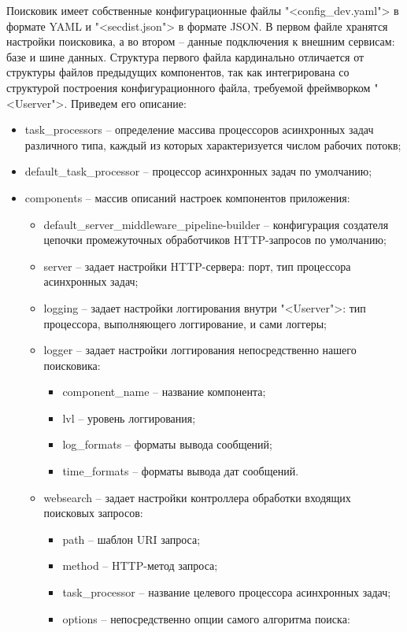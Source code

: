 Поисковик имеет собственные конфигурационные файлы "<config\_dev.yaml"> в формате YAML и "<secdist.json"> в формате JSON. В первом файле хранятся настройки поисковика, а во втором -- данные подключения к внешним сервисам: базе и шине данных. Структура первого файла кардинально отличается от структуры файлов предыдущих компонентов, так как интегрирована со структурой построения конфигурационного файла, требуемой фреймворком "<Userver">. Приведем его описание:
\begin{itemize}
\item task\_processors -- определение массива процессоров асинхронных задач различного типа, каждый из которых характеризуется числом рабочих потокв;
\item default\_task\_processor -- процессор асинхронных задач по умолчанию;
\item components -- массив описаний настроек компонентов приложения:
\begin{itemize}
\item default\_server\_middleware\_pipeline-builder -- конфигурация создателя цепочки промежуточных обработчиков HTTP-запросов по умолчанию;
\item server -- задает настройки HTTP-сервера: порт, тип процессора асинхронных задач;
\item logging -- задает настройки логгирования внутри "<Userver">: тип процессора, выполняющего логгирование, и сами логгеры;
\item logger -- задает настройки логгирования непосредственно нашего поисковика:
\begin{itemize}
\item component\_name -- название компонента;
\item lvl -- уровень логгирования;
\item log\_formats -- форматы вывода сообщений;
\item time\_formats -- форматы вывода дат сообщений.
\end{itemize}
\item websearch -- задает настройки контроллера обработки входящих поисковых запросов:
\begin{itemize}
\item path -- шаблон URI запроса;
\item method -- HTTP-метод запроса;
\item task\_processor -- название целевого процессора асинхронных задач;
\item options -- непосредственно опции самого алгоритма поиска:
\begin{itemize}

\end{itemize}
\end{itemize}
\end{itemize}
\end{itemize}
